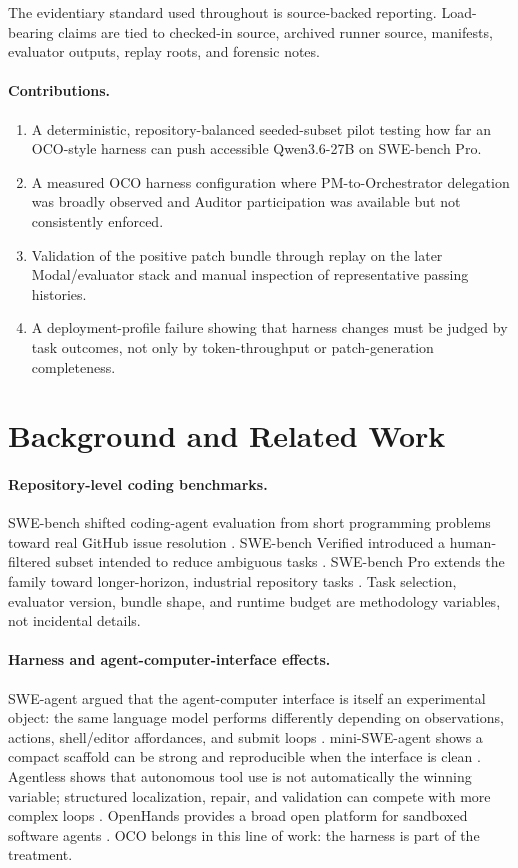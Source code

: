 \documentclass[11pt]{article}
\begin{document}
The evidentiary standard used throughout is source-backed reporting. Load-bearing claims are tied to checked-in source, archived runner source, manifests, evaluator outputs, replay roots, and forensic notes.

\paragraph{Contributions.}
\begin{enumerate}
  \item A deterministic, repository-balanced seeded-subset pilot testing how far an OCO-style harness can push accessible Qwen3.6-27B on SWE-bench Pro.
  \item A measured OCO harness configuration where PM-to-Orchestrator delegation was broadly observed and Auditor participation was available but not consistently enforced.
  \item Validation of the positive patch bundle through replay on the later Modal/evaluator stack and manual inspection of representative passing histories.
  \item A deployment-profile failure showing that harness changes must be judged by task outcomes, not only by token-throughput or patch-generation completeness.
\end{enumerate}

\section{Background and Related Work}

\paragraph{Repository-level coding benchmarks.}
SWE-bench shifted coding-agent evaluation from short programming problems toward real GitHub issue resolution \cite{jimenez2024swebench}. SWE-bench Verified introduced a human-filtered subset intended to reduce ambiguous tasks \cite{swebenchverified2024}. SWE-bench Pro extends the family toward longer-horizon, industrial repository tasks \cite{deng2025swebenchpro}. Task selection, evaluator version, bundle shape, and runtime budget are methodology variables, not incidental details.

\paragraph{Harness and agent-computer-interface effects.}
SWE-agent argued that the agent-computer interface is itself an experimental object: the same language model performs differently depending on observations, actions, shell/editor affordances, and submit loops \cite{yang2024sweagent}. mini-SWE-agent shows a compact scaffold can be strong and reproducible when the interface is clean \cite{sweagent2025minisweagent}. Agentless shows that autonomous tool use is not automatically the winning variable; structured localization, repair, and validation can compete with more complex loops \cite{xia2025agentless}. OpenHands provides a broad open platform for sandboxed software agents \cite{wang2025openhands}. OCO belongs in this line of work: the harness is part of the treatment.
\end{document}
